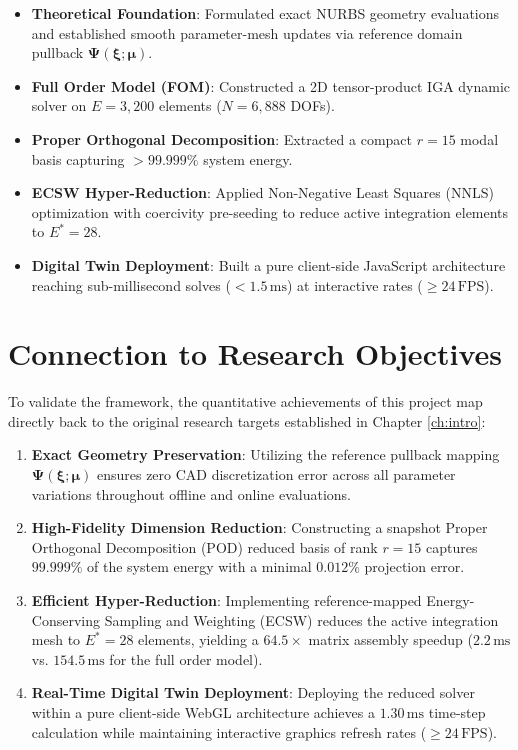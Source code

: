 \begin{itemize}[leftmargin=*]
    \item \textbf{Theoretical Foundation}: Formulated exact NURBS geometry evaluations and established smooth parameter-mesh updates via reference domain pullback $\boldsymbol{\Psi}(\boldsymbol{\xi}; \boldsymbol{\mu})$.
    \item \textbf{Full Order Model (FOM)}: Constructed a 2D tensor-product IGA dynamic solver on $E = 3,200$ elements ($N = 6,888$ DOFs).
    \item \textbf{Proper Orthogonal Decomposition}: Extracted a compact $r = 15$ modal basis capturing $>99.999\%$ system energy.
    \item \textbf{ECSW Hyper-Reduction}: Applied Non-Negative Least Squares (NNLS) optimization with coercivity pre-seeding to reduce active integration elements to $E^* = 28$.
    \item \textbf{Digital Twin Deployment}: Built a pure client-side JavaScript architecture reaching sub-millisecond solves ($<1.5\,\text{ms}$) at interactive rates ($\ge 24\,\text{FPS}$).
\end{itemize}

\section{Connection to Research Objectives}

To validate the framework, the quantitative achievements of this project map directly back to the original research targets established in Chapter \ref{ch:intro}:

\begin{enumerate}[leftmargin=*]
    \item \textbf{Exact Geometry Preservation}: Utilizing the reference pullback mapping $\boldsymbol{\Psi}(\boldsymbol{\xi}; \boldsymbol{\mu})$ ensures zero CAD discretization error across all parameter variations throughout offline and online evaluations.
    \item \textbf{High-Fidelity Dimension Reduction}: Constructing a snapshot Proper Orthogonal Decomposition (POD) reduced basis of rank $r = 15$ captures $99.999\%$ of the system energy with a minimal $0.012\%$ projection error.
    \item \textbf{Efficient Hyper-Reduction}: Implementing reference-mapped Energy-Conserving Sampling and Weighting (ECSW) reduces the active integration mesh to $E^* = 28$ elements, yielding a $64.5\times$ matrix assembly speedup ($2.2\,\text{ms}$ vs. $154.5\,\text{ms}$ for the full order model).
    \item \textbf{Real-Time Digital Twin Deployment}: Deploying the reduced solver within a pure client-side WebGL architecture achieves a $1.30\,\text{ms}$ time-step calculation while maintaining interactive graphics refresh rates ($\ge 24\,\text{FPS}$).
\end{enumerate}

